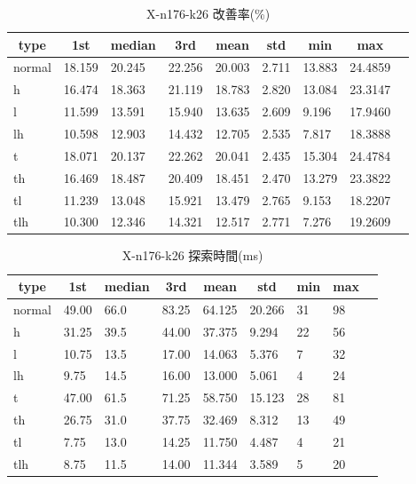 \begin{table}[htbp]
    \caption{X-n176-k26 改善率(\%)}
    \begin{tabular}{|l|l|l|l|l|l|l|l|l|}\hline
    \multicolumn{1}{|c|}{\textbf{type}}
    &\multicolumn{1}{|c|}{\textbf{1st}}
    &\multicolumn{1}{c|}{\textbf{median}}
    &\multicolumn{1}{c|}{\textbf{3rd}}
    &\multicolumn{1}{c|}{\textbf{mean}}
    &\multicolumn{1}{c|}{\textbf{std}}
    &\multicolumn{1}{c|}{\textbf{min}}
    &\multicolumn{1}{c|}{\textbf{max}}\\\hline
	normal & 18.159 & 20.245 & 22.256 & 20.003 & 2.711 & 13.883 & 24.4859\\\hline
	h & 16.474 & 18.363 & 21.119 & 18.783 & 2.820 & 13.084 & 23.3147\\\hline
	l & 11.599 & 13.591 & 15.940 & 13.635 & 2.609 & 9.196 & 17.9460\\\hline
	lh & 10.598 & 12.903 & 14.432 & 12.705 & 2.535 & 7.817 & 18.3888\\\hline
	t & 18.071 & 20.137 & 22.262 & 20.041 & 2.435 & 15.304 & 24.4784\\\hline
	th & 16.469 & 18.487 & 20.409 & 18.451 & 2.470 & 13.279 & 23.3822\\\hline
	tl & 11.239 & 13.048 & 15.921 & 13.479 & 2.765 & 9.153 & 18.2207\\\hline
	tlh & 10.300 & 12.346 & 14.321 & 12.517 & 2.771 & 7.276 & 19.2609\\\hline
	\end{tabular}
\end{table}
\begin{table}[htbp]
    \caption{X-n176-k26 探索時間(ms)}
    \begin{tabular}{|l|l|l|l|l|l|l|l|l|}\hline
    \multicolumn{1}{|c|}{\textbf{type}}
    &\multicolumn{1}{|c|}{\textbf{1st}}
    &\multicolumn{1}{c|}{\textbf{median}}
    &\multicolumn{1}{c|}{\textbf{3rd}}
    &\multicolumn{1}{c|}{\textbf{mean}}
    &\multicolumn{1}{c|}{\textbf{std}}
    &\multicolumn{1}{c|}{\textbf{min}}
    &\multicolumn{1}{c|}{\textbf{max}}\\\hline
	normal & 49.00 & 66.0 & 83.25 & 64.125 & 20.266 & 31 & 98\\\hline
	h & 31.25 & 39.5 & 44.00 & 37.375 & 9.294 & 22 & 56\\\hline
	l & 10.75 & 13.5 & 17.00 & 14.063 & 5.376 & 7 & 32\\\hline
	lh & 9.75 & 14.5 & 16.00 & 13.000 & 5.061 & 4 & 24\\\hline
	t & 47.00 & 61.5 & 71.25 & 58.750 & 15.123 & 28 & 81\\\hline
	th & 26.75 & 31.0 & 37.75 & 32.469 & 8.312 & 13 & 49\\\hline
	tl & 7.75 & 13.0 & 14.25 & 11.750 & 4.487 & 4 & 21\\\hline
	tlh & 8.75 & 11.5 & 14.00 & 11.344 & 3.589 & 5 & 20\\\hline
	\end{tabular}
\end{table}
